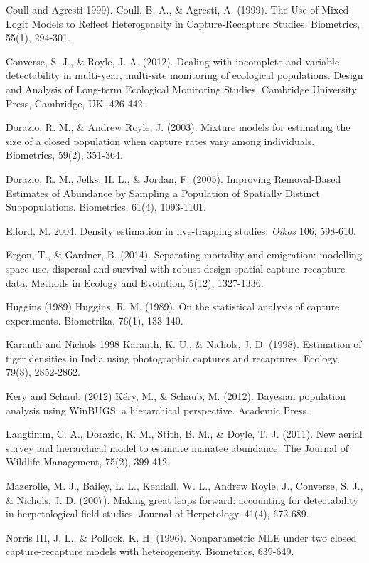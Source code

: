 \documentclass{book}
\begin{document}
\rf Coull and Agresti 1999).
Coull, B. A., & Agresti, A. (1999). The Use of Mixed Logit Models to
Reflect Heterogeneity in Capture‐Recapture Studies. Biometrics, 55(1),
294-301.

\rf 
Converse, S. J., & Royle, J. A. (2012). Dealing with incomplete and
variable detectability in multi-year, multi-site monitoring of
ecological populations. Design and Analysis of Long-term Ecological
Monitoring Studies. Cambridge University Press, Cambridge, UK,
426-442.

\rf Dorazio, R. M., \& Andrew Royle, J. (2003). Mixture models for
estimating the size of a closed population when capture rates vary
among individuals. Biometrics, 59(2), 351-364.

\rf Dorazio, R. M., Jelks, H. L., \& Jordan, F. (2005). Improving
Removal‐Based Estimates of Abundance by Sampling a Population of
Spatially Distinct Subpopulations. Biometrics, 61(4), 1093-1101.

\rf Efford, M. 2004. Density estimation in live-trapping studies. 
{\it Oikos}  106, 598-610.

\rf Ergon, T., \& Gardner, B. (2014). Separating mortality and emigration: modelling space use, dispersal and survival with robust‐design spatial capture–recapture data. Methods in Ecology and Evolution, 5(12), 1327-1336.


\rf Huggins (1989) 
Huggins, R. M. (1989). On the statistical analysis of capture
experiments. Biometrika, 76(1), 133-140.

\rf  Karanth and Nichols 1998
Karanth, K. U., & Nichols, J. D. (1998). Estimation of tiger densities in India using photographic captures and recaptures. Ecology, 79(8), 2852-2862.

\rf Kery and Schaub (2012)
Kéry, M., & Schaub, M. (2012). Bayesian population analysis using WinBUGS: a hierarchical perspective. Academic Press.

\rf Langtimm, C. A., Dorazio, R. M., Stith, B. M., & Doyle,
T. J. (2011). New aerial survey and hierarchical model to estimate
manatee abundance. The Journal of Wildlife Management, 75(2), 399-412.

\rf Mazerolle, M. J., Bailey, L. L., Kendall, W. L., Andrew Royle, J., Converse, S. J., \& Nichols, J. D. (2007). Making great leaps forward: accounting for detectability in herpetological field studies. Journal of Herpetology, 41(4), 672-689.

\rf Norris III, J. L., \& Pollock, K. H. (1996). Nonparametric MLE under
two closed capture-recapture models with heterogeneity. Biometrics,
639-649.
\end{document}
